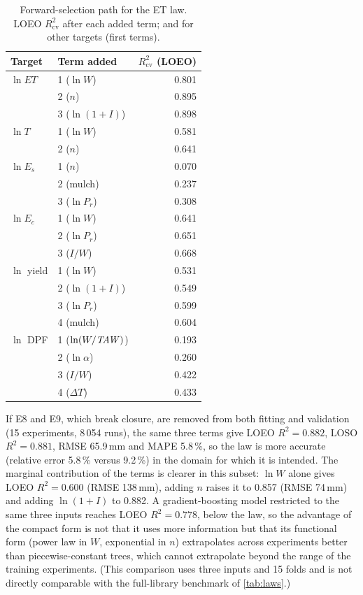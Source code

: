 \begin{table}[H]\centering\small
\caption{Forward-selection path for the ET law. LOEO $R^2_{\mathrm{cv}}$ after each added term; and for other targets (first terms).}
\label{tab:path}
\begin{tabular}{llr}
\toprule
Target & Term added & $R^2_{\mathrm{cv}}$ (LOEO)\\\midrule
$\ln\mathit{ET}$ & 1 ($\ln W$) & 0.801\\
 & 2 ($n$) & 0.895\\
 & 3 ($\ln(1+I)$) & 0.898\\
$\ln T$ & 1 ($\ln W$) & 0.581\\
 & 2 ($n$) & 0.641\\
$\ln E_s$ & 1 ($n$) & 0.070\\
 & 2 (mulch) & 0.237\\
 & 3 ($\ln P_r$) & 0.308\\
$\ln E_c$ & 1 ($\ln W$) & 0.641\\
 & 2 ($\ln P_r$) & 0.651\\
 & 3 ($I/W$) & 0.668\\
$\ln$ yield & 1 ($\ln W$) & 0.531\\
 & 2 ($\ln(1+I)$) & 0.549\\
 & 3 ($\ln P_r$) & 0.599\\
 & 4 (mulch) & 0.604\\
$\ln$ DPF & 1 ($\ln(W/\mathit{TAW})$) & 0.193\\
 & 2 ($\ln\alpha$) & 0.260\\
 & 3 ($I/W$) & 0.422\\
 & 4 ($\Delta T$) & 0.433\\\bottomrule
\end{tabular}
\end{table}

If E8 and E9, which break closure, are removed from both fitting and validation (15 experiments, 8\,054 runs), the same three terms give LOEO $R^2=0.882$, LOSO $R^2=0.881$, RMSE 65.9\,mm and MAPE 5.8\,\%, so the law is more accurate (relative error 5.8\,\% versus 9.2\,\%) in the domain for which it is intended. The marginal contribution of the terms is clearer in this subset: $\ln W$ alone gives LOEO $R^2=0.600$ (RMSE 138\,mm), adding $n$ raises it to 0.857 (RMSE 74\,mm) and adding $\ln(1+I)$ to 0.882. A gradient-boosting model restricted to the same three inputs reaches LOEO $R^2=0.778$, below the law, so the advantage of the compact form is not that it uses more information but that its functional form (power law in $W$, exponential in $n$) extrapolates across experiments better than piecewise-constant trees, which cannot extrapolate beyond the range of the training experiments. (This comparison uses three inputs and 15 folds and is not directly comparable with the full-library benchmark of \cref{tab:laws}.)

